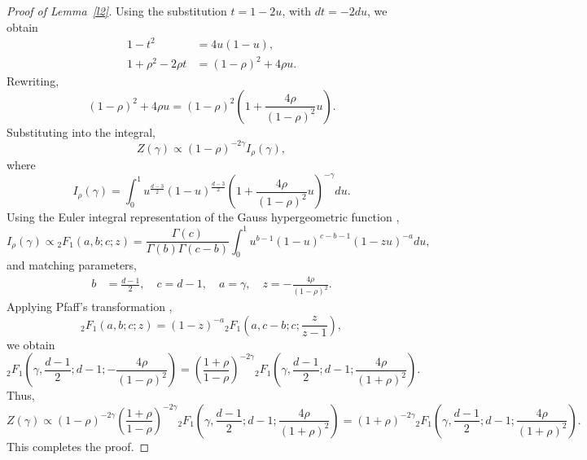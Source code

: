 \documentclass{article}
\begin{document}
\begin{proof}[Proof of Lemma~\ref{l2}]
Using the substitution $t = 1 - 2u$, with $dt = -2 du$, we obtain
\begin{align*}
    1 - t^2 &= 4u(1 - u), \\
    1 + \rho^2 - 2\rho t &= (1 - \rho)^2 + 4\rho u.
\end{align*}
Rewriting,
\begin{equation*}
    (1 - \rho)^2 + 4\rho u = (1 - \rho)^2 \left(1 + \frac{4\rho}{(1 - \rho)^2} u \right).
\end{equation*}
Substituting into the integral,
\begin{equation*}
    Z(\gamma) \propto (1 - \rho)^{-2\gamma} I_{\rho}(\gamma),
\end{equation*}
where
\begin{equation}
    I_{\rho}(\gamma) = \int_0^1 u^{\frac{d-3}{2}} (1 - u)^{\frac{d-3}{2}} \left(1 + \frac{4\rho}{(1 - \rho)^2} u \right)^{-\gamma} du.
\end{equation}
Using the Euler integral representation of the Gauss hypergeometric function \cite[15.6.1]{watson:DLMF},
\begin{equation*}
    I_{\rho}(\gamma) \propto {}_2F_1(a, b; c; z) = \frac{\Gamma(c)}{\Gamma(b) \Gamma(c - b)} \int_0^1 u^{b-1} (1 - u)^{c - b - 1} (1 - zu)^{-a} du,
\end{equation*}
and matching parameters,
\begin{align*}
    b &= \frac{d-1}{2}, \quad c = d-1, \quad a = \gamma, \quad z = -\frac{4\rho}{(1 - \rho)^2}.
\end{align*}
Applying Pfaff’s transformation \cite[15.8.1, 15.1.2]{watson:DLMF},
\begin{equation*}
    {}_2F_1(a, b; c; z) = (1 - z)^{-a} {}_2F_1\left(a, c - b; c; \frac{z}{z - 1} \right),
\end{equation*}
we obtain
\begin{equation*}
    {}_2F_1 \left(\gamma, \frac{d-1}{2}; d-1; -\frac{4\rho}{(1 - \rho)^2} \right) = \left(\frac{1+\rho}{1-\rho}\right)^{-2\gamma} {}_2F_1 \left(\gamma, \frac{d-1}{2}; d-1; \frac{4\rho}{(1 + \rho)^2} \right).
\end{equation*}
Thus,
\begin{equation*}
    Z(\gamma) \propto (1 - \rho)^{-2\gamma}\left(\frac{1+\rho}{1-\rho}\right)^{-2\gamma} {}_2F_1 \left(\gamma, \frac{d-1}{2}; d-1; \frac{4\rho}{(1 + \rho)^2} \right) = \left(1 + \rho\right)^{-2\gamma}  {}_2F_1 \left(\gamma, \frac{d-1}{2}; d-1; \frac{4\rho}{(1 + \rho)^2} \right).
\end{equation*}
This completes the proof.
\end{proof}
\end{document}
